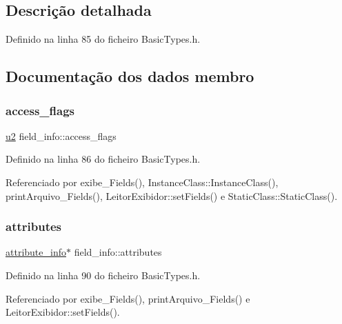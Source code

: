 \subsection{Descrição detalhada}


Definido na linha 85 do ficheiro Basic\+Types.\+h.



\subsection{Documentação dos dados membro}
\mbox{\label{structfield__info_aa622dc9a5b5353d2f3eb2f416dacab4b}} 
\subsubsection{\texorpdfstring{access\+\_\+flags}{access\_flags}}
{\footnotesize\ttfamily \hyperlink{BasicTypes_8h_a732cde1300aafb73b0ea6c2558a7a54f}{u2} field\+\_\+info\+::access\+\_\+flags}



Definido na linha 86 do ficheiro Basic\+Types.\+h.



Referenciado por exibe\+\_\+\+Fields(), Instance\+Class\+::\+Instance\+Class(), print\+Arquivo\+\_\+\+Fields(), Leitor\+Exibidor\+::set\+Fields() e Static\+Class\+::\+Static\+Class().

\mbox{\label{structfield__info_afdda114944ae5eaae78c237f99257108}} 
\subsubsection{\texorpdfstring{attributes}{attributes}}
{\footnotesize\ttfamily \hyperlink{structattribute__info}{attribute\+\_\+info}$\ast$ field\+\_\+info\+::attributes}



Definido na linha 90 do ficheiro Basic\+Types.\+h.



Referenciado por exibe\+\_\+\+Fields(), print\+Arquivo\+\_\+\+Fields() e Leitor\+Exibidor\+::set\+Fields().

